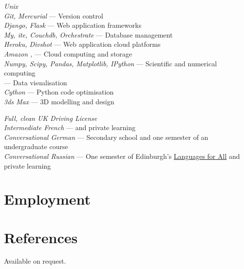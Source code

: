 \documentclass[10pt]{article}
\begin{document}
        {
            \textit{Unix}\\
            \textit{Git, Mercurial} --- Version control\\
            \textit{Django, Flask} --- Web application frameworks\\
            \textit{My, ite, Couchdb, Orchestrate} --- Database management\\
            \textit{Heroku, Divshot} --- Web application cloud platforms\\
            \textit{Amazon , } --- Cloud computing and storage\\
            \textit{Numpy, Scipy, Pandas, Matplotlib, IPython} --- Scientific and numerical computing\\
            \textit{} --- Data visualisation\\
            \textit{Cython} --- Python code optimisation\\
            \textit{3ds Max} --- 3D modelling and design
        }


        {
            \textit{Full, clean UK Driving License}\\
            \textit{Intermediate French} ---   and private learning\\
            \textit{Conversational German} --- Secondary school and one semester of an undergraduate course\\
            \textit{Conversational Russian} --- One semester of Edinburgh's \href{http://www.ed.ac.uk/studying/short-courses/languages/for-all}{Languages for All} and private learning
        }

    \section{Employment}




    \section{References}

        Available on request.
\end{document}
